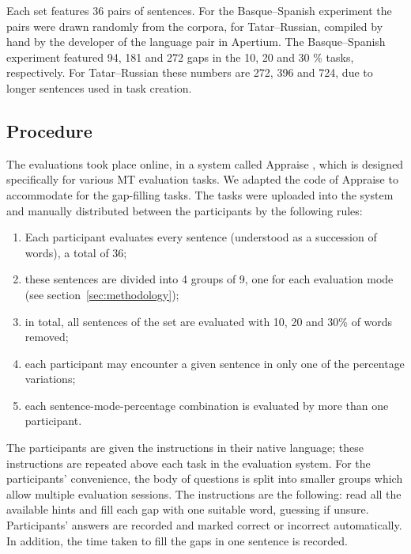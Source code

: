 \documentclass[11pt]{article}
\newcommand{\comment}[1]{}
\begin{document}
Each set features 36 pairs of sentences. For the Basque--Spanish experiment the pairs were drawn
randomly from the corpora, for Tatar--Russian, compiled by hand by the developer of the
language pair in Apertium. The Basque--Spanish experiment featured 94, 181 and 272 gaps in the 10, 20 and 30 \% tasks, respectively. For Tatar--Russian these numbers are 272, 396 and 724, due to longer sentences used in task creation. \comment{EA to JA: Ilnar wanted to test the system on his own sentences, should I put it in the paper?}

\subsection{Procedure}

The evaluations took place online, in a system called Appraise \citep{federmann12}, which is 
designed specifically for various MT evaluation tasks. We adapted the code of Appraise to 
accommodate for the gap-filling tasks. The tasks were uploaded into the system and 
manually distributed between the participants by the following rules:
\begin{enumerate}
\item  Each participant evaluates every sentence (understood as a succession of words),
a total of 36;
\item  these sentences are divided into 4 groups of 9, one for each evaluation mode (see section~\ref{sec:methodology});
\item in total, all sentences of the set are evaluated with 10, 20 and 30\% of words removed;
\item each participant may encounter a given sentence in only one of the percentage variations;
\item  each sentence-mode-percentage combination is evaluated by more than one participant.
\end{enumerate}


The participants are given the instructions in their native language; these instructions are repeated above each task in the evaluation system. For the participants' convenience, the body of questions is split into smaller groups which allow multiple evaluation sessions. The instructions are the 
following: read all the available hints and fill each gap with one suitable word, guessing if unsure.
Participants' answers are recorded and marked correct or incorrect automatically. \comment{EA 11,16: should I try to clarify this? one of the reviewers thought it was manual work}In
addition, the time taken to fill the gaps in one sentence is recorded.
\end{document}
